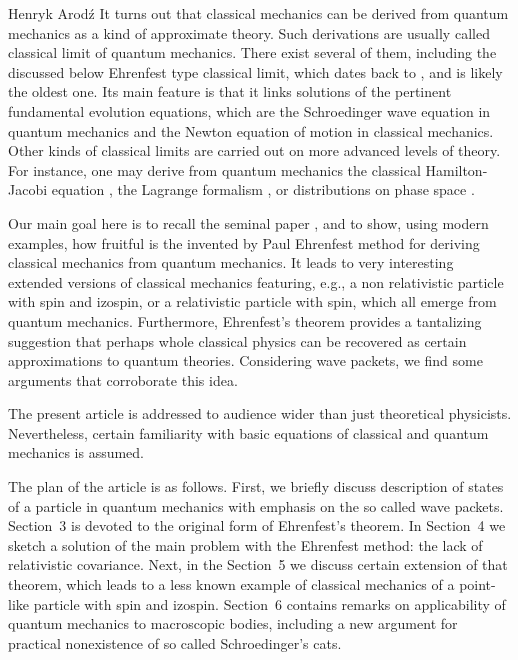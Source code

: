 \begin{artengenv}{Henryk Arod\'z}
 It turns out that classical mechanics can be derived from quantum mechanics as a kind of approximate theory. Such derivations are usually called classical limit of quantum mechanics. There exist several of them, including the discussed below Ehrenfest type classical limit, which dates back to \cite*{ehr}, and is likely the oldest one. Its main feature is that it links solutions of the pertinent fundamental evolution equations, which are the Schroedinger wave equation in quantum mechanics and the Newton equation of motion in classical mechanics. Other kinds of classical limits are carried out on more advanced levels of theory. For instance, one may derive from quantum mechanics the classical Hamilton-Jacobi equation \parencite[see, e.g.][chap.8, sec.34]{WKB}, the Lagrange formalism \parencite[see, e.g.][chap.1, sec.2]{pathint}, or distributions on phase space \parencite[see, e.g.][]{siegel,wignerdistr}.



Our main goal here is to recall the seminal paper \parencite{ehr}, and to show, using modern examples, how fruitful is the invented by Paul Ehrenfest method for deriving classical mechanics from quantum mechanics. It leads to very interesting extended versions of classical mechanics featuring, e.g., a non relativistic particle with spin and izospin, or a relativistic particle with spin, which all emerge from quantum mechanics. Furthermore, Ehrenfest's theorem provides a tantalizing suggestion that perhaps whole classical physics can be recovered as certain approximations to quantum theories. Considering wave packets, we find some arguments that corroborate this idea. 

 

The present article is addressed to audience wider than just theoretical physicists. Nevertheless, certain familiarity with basic equations of classical and quantum mechanics is assumed. 






The plan of the article is as follows. First, we briefly discuss description of states of a particle in quantum mechanics with emphasis on the so called wave packets. Section~3 
is devoted to the original form of Ehrenfest's theorem. In Section~4 we sketch a solution of the main problem with the Ehrenfest method: the lack of relativistic covariance. 
Next, in the Section~5 we discuss certain extension of that theorem, which leads to a less known example of classical mechanics of a point-like particle with spin and izospin. Section~6 contains remarks on applicability of quantum mechanics to macroscopic bodies, including a new argument for practical nonexistence of so called Schroedinger's cats. 













\end{artengenv}
